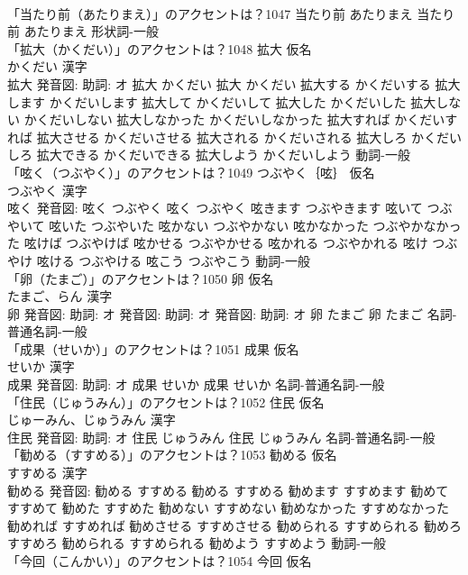 \documentclass[8pt]{extreport}
\begin{document}
\begin{CJK}{UTF8}{min}
\\	「当たり前（あたりまえ）」のアクセントは？1047		当たり前 あたりまえ		当たり前 あたりまえ				形状詞-一般 
\\	「拡大（かくだい）」のアクセントは？1048	拡大 仮名　
\\	かくだい 漢字　
\\	拡大 発音図: 助詞: オ	拡大 かくだい		拡大 かくだい 拡大する かくだいする 拡大します かくだいします 拡大して かくだいして 拡大した かくだいした 拡大しない かくだいしない 拡大しなかった かくだいしなかった 拡大すれば かくだいすれば 拡大させる かくだいさせる 拡大される かくだいされる 拡大しろ かくだいしろ 拡大できる かくだいできる 拡大しよう かくだいしよう				動詞-一般 
\\	「呟く（つぶやく）」のアクセントは？1049	つぶやく｛呟｝ 仮名　
\\	つぶやく 漢字　
\\	呟く 発音図:	呟く つぶやく		呟く つぶやく 呟きます つぶやきます 呟いて つぶやいて 呟いた つぶやいた 呟かない つぶやかない 呟かなかった つぶやかなかった 呟けば つぶやけば 呟かせる つぶやかせる 呟かれる つぶやかれる 呟け つぶやけ 呟ける つぶやける 呟こう つぶやこう				動詞-一般 
\\	「卵（たまご）」のアクセントは？1050	卵 仮名　
\\	たまご、らん 漢字　
\\	卵 発音図: 助詞: オ 発音図: 助詞: オ 発音図: 助詞: オ	卵 たまご		卵 たまご				名詞-普通名詞-一般 
\\	「成果（せいか）」のアクセントは？1051	成果 仮名　
\\	せいか 漢字　
\\	成果 発音図: 助詞: オ	成果 せいか		成果 せいか				名詞-普通名詞-一般 
\\	「住民（じゅうみん）」のアクセントは？1052	住民 仮名　
\\	じゅーみん、じゅうみん 漢字　
\\	住民 発音図: 助詞: オ	住民 じゅうみん		住民 じゅうみん				名詞-普通名詞-一般 
\\	「勧める（すすめる）」のアクセントは？1053	勧める 仮名　
\\	すすめる 漢字　
\\	勧める 発音図:	勧める すすめる		勧める すすめる 勧めます すすめます 勧めて すすめて 勧めた すすめた 勧めない すすめない 勧めなかった すすめなかった 勧めれば すすめれば 勧めさせる すすめさせる 勧められる すすめられる 勧めろ すすめろ 勧められる すすめられる 勧めよう すすめよう				動詞-一般 
\\	「今回（こんかい）」のアクセントは？1054	今回 仮名　

\end{CJK}
\end{document}
